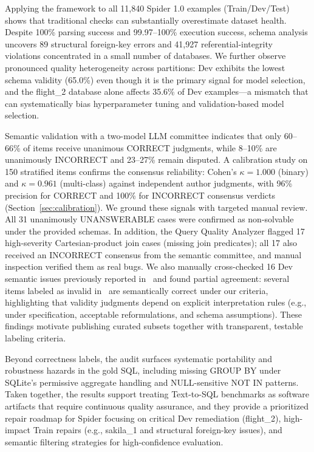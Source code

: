 \documentclass[print]{einformatica}
\begin{document}
Applying the framework to all 11,840 Spider 1.0 examples (Train/Dev/Test) shows that traditional checks can substantially overestimate dataset health. Despite 100\% parsing success and 99.97--100\% execution success, schema analysis uncovers 89 structural foreign-key errors and 41,927 referential-integrity violations concentrated in a small number of databases. We further observe pronounced quality heterogeneity across partitions: Dev exhibits the lowest schema validity (65.0\%) even though it is the primary signal for model selection, and the flight\_2 database alone affects 35.6\% of Dev examples---a mismatch that can systematically bias hyperparameter tuning and validation-based model selection.

Semantic validation with a two-model LLM committee indicates that only 60--66\% of items receive unanimous CORRECT judgments, while 8--10\% are unanimously INCORRECT and 23--27\% remain disputed. A calibration study on 150 stratified items confirms the consensus reliability: Cohen's $\kappa = 1.000$ (binary) and $\kappa = 0.961$ (multi-class) against independent author judgments, with 96\% precision for CORRECT and 100\% for INCORRECT consensus verdicts (Section~\ref{sec:calibration}). We ground these signals with targeted manual review. All 31 unanimously UNANSWERABLE cases were confirmed as non-solvable under the provided schemas. In addition, the Query Quality Analyzer flagged 17 high-severity Cartesian-product join cases (missing join predicates); all 17 also received an INCORRECT consensus from the semantic committee, and manual inspection verified them as real bugs. We also manually cross-checked 16 Dev semantic issues previously reported in~\cite{liu2025nl2sqlbugs} and found partial agreement: several items labeled as invalid in~\cite{liu2025nl2sqlbugs} are semantically correct under our criteria, highlighting that validity judgments depend on explicit interpretation rules (e.g., under specification, acceptable reformulations, and schema assumptions). These findings motivate publishing curated subsets together with transparent, testable labeling criteria.

Beyond correctness labels, the audit surfaces systematic portability and robustness hazards in the gold SQL, including missing GROUP BY under SQLite's permissive aggregate handling and NULL-sensitive NOT IN patterns. Taken together, the results support treating Text-to-SQL benchmarks as software artifacts that require continuous quality assurance, and they provide a prioritized repair roadmap for Spider focusing on critical Dev remediation (flight\_2), high-impact Train repairs (e.g., sakila\_1 and structural foreign-key issues), and semantic filtering strategies for high-confidence evaluation.
\end{document}
